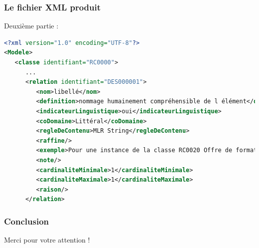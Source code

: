 \documentclass{beamer}
\begin{document}
\begin{frame}[fragile]
\frametitle{Le fichier XML produit}

Deuxième partie :

\vspace{0.5cm}
\begin{lstlisting}[language=XML]
<?xml version="1.0" encoding="UTF-8"?>
<Modele>
   <classe identifiant="RC0000">
      ...
      <relation identifiant="DES000001">
         <nom>libellé</nom>
         <definition>nommage humainement compréhensible de l élément</definition>
         <indicateurLinguistique>oui</indicateurLinguistique>
         <coDomaine>Littéral</coDomaine>
         <regleDeContenu>MLR String</regleDeContenu>
         <raffine/>
         <exemple>Pour une instance de la classe RC0020 Offre de formation, le libellé pourraît être " BTS services informatiques aux organisations"</exemple>
         <note/>
         <cardinaliteMinimale>1</cardinaliteMinimale>
         <cardinaliteMaximale>1</cardinaliteMaximale>
         <raison/>
      </relation>
\end{lstlisting}
\end{frame}

\begin{frame}
\frametitle{Conclusion}

Merci pour votre attention !


\end{frame}
\end{document}
